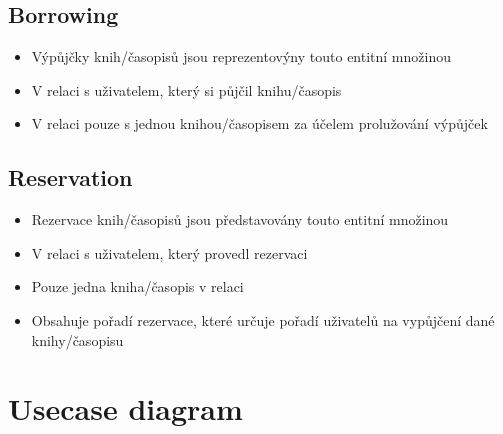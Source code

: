 \documentclass{article}
\begin{document}
\subsection*{Borrowing}
\begin{itemize}
    \item Výpůjčky knih/časopisů jsou reprezentovýny touto entitní množinou
    \item V relaci s uživatelem, který si půjčil knihu/časopis
    \item V relaci pouze s jednou knihou/časopisem za účelem prolužování
    výpůjček
\end{itemize}

\subsection*{Reservation}
\begin{itemize}
    \item Rezervace knih/časopisů jsou představovány touto entitní množinou
    \item V relaci s uživatelem, který provedl rezervaci
    \item Pouze jedna kniha/časopis v relaci
    \item Obsahuje pořadí rezervace, které určuje pořadí uživatelů na vypůjčení
    dané knihy/časopisu
\end{itemize}

\newpage

\section*{Usecase diagram}
\end{document}
